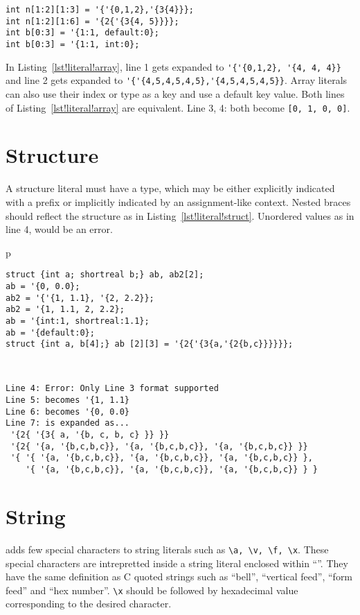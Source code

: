 \begin{lstlisting}[label=lst!literal!array, caption=Array Literal
    examples]
int n[1:2][1:3] = '{'{0,1,2},'{3{4}}};
int n[1:2][1:6] = '{2{'{3{4, 5}}}};
int b[0:3] = '{1:1, default:0};
int b[0:3] = '{1:1, int:0};
\end{lstlisting}

In Listing~\ref{lst!literal!array}, line 1 gets expanded to
\verb|'{'{0,1,2}, '{4, 4, 4}}| and line 2 gets expanded to
\verb|'{'{4,5,4,5,4,5},'{4,5,4,5,4,5}}|.  Array literals can also use
their index or type as a key and use a default key value. Both lines
of Listing~\ref{lst!literal!array} are equivalent. Line 3, 4: both
become \verb|[0, 1, 0, 0]|.

\section{Structure}
A structure literal must have a type, which may be either explicitly
indicated with a prefix or implicitly indicated by an assignment-like
context. Nested braces should reflect the structure as in
Listing~\ref{lst!literal!struct}. Unordered values as in line 4, would
be an error.

\begin{table}
\begin{tabular}{p\textwidth}
\begin{lstlisting}[label=lst!literal!struct, caption=Structure Literals]
struct {int a; shortreal b;} ab, ab2[2];
ab = '{0, 0.0};
ab2 = '{'{1, 1.1}, '{2, 2.2}};
ab2 = '{1, 1.1, 2, 2.2};
ab = '{int:1, shortreal:1.1};
ab = '{default:0};
struct {int a, b[4];} ab [2][3] = '{2{'{3{a,'{2{b,c}}}}}};
\end{lstlisting}
\\
\begin{tbldesc}
\begin{verbatim}
Line 4: Error: Only Line 3 format supported
Line 5: becomes '{1, 1.1}
Line 6: becomes '{0, 0.0}
Line 7: is expanded as...
 '{2{ '{3{ a, '{b, c, b, c} }} }}
 '{2{ '{a, '{b,c,b,c}}, '{a, '{b,c,b,c}}, '{a, '{b,c,b,c}} }}
 '{ '{ '{a, '{b,c,b,c}}, '{a, '{b,c,b,c}}, '{a, '{b,c,b,c}} },
    '{ '{a, '{b,c,b,c}}, '{a, '{b,c,b,c}}, '{a, '{b,c,b,c}} } }
\end{verbatim}
\end{tbldesc}
\end{tabular}
\end{table}

\section{String}
\lsvlog adds few special characters to string literals such as
\texttt{\textbackslash{}a, \textbackslash{}v, \textbackslash{}f,
  \textbackslash{}x}. These special characters are intrepretted inside
a string literal enclosed within ``''. They have the same definition
as C quoted strings such as ``bell'', ``vertical feed'', ``form feed''
and ``hex number''. \texttt{\textbackslash{}x} should be followed by
hexadecimal value corresponding to the desired character.

